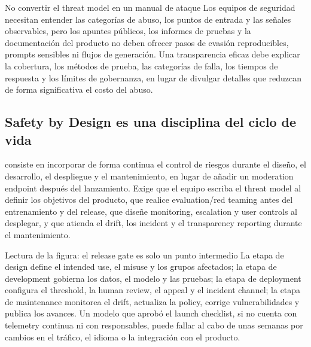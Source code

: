 \begin{warningbox}{No convertir el threat model en un manual de ataque}
Los equipos de seguridad necesitan entender las categorías de abuso, los puntos de entrada y las señales observables, pero los apuntes públicos, los informes de pruebas y la documentación del producto no deben ofrecer pasos de evasión reproducibles, prompts sensibles ni flujos de generación. Una transparencia eficaz debe explicar la cobertura, los métodos de prueba, las categorías de falla, los tiempos de respuesta y los límites de gobernanza, en lugar de divulgar detalles que reduzcan de forma significativa el costo del abuso.
\end{warningbox}

\subsection{Safety by Design es una disciplina del ciclo de vida}

 consiste en incorporar de forma continua el control de riesgos durante el diseño, el desarrollo, el despliegue y el mantenimiento, en lugar de añadir un moderation endpoint después del lanzamiento. Exige que el equipo escriba el threat model al definir los objetivos del producto, que realice evaluation/red teaming antes del entrenamiento y del release, que diseñe monitoring, escalation y user controls al desplegar, y que atienda el drift, los incident y el transparency reporting durante el mantenimiento.


\begin{knowledgebox}{Lectura de la figura: el release gate es solo un punto intermedio}
La etapa de design define el intended use, el misuse y los grupos afectados; la etapa de development gobierna los datos, el modelo y las pruebas; la etapa de deployment configura el threshold, la human review, el appeal y el incident channel; la etapa de maintenance monitorea el drift, actualiza la policy, corrige vulnerabilidades y publica los avances. Un modelo que aprobó el launch checklist, si no cuenta con telemetry continua ni con responsables, puede fallar al cabo de unas semanas por cambios en el tráfico, el idioma o la integración con el producto.
\end{knowledgebox}

